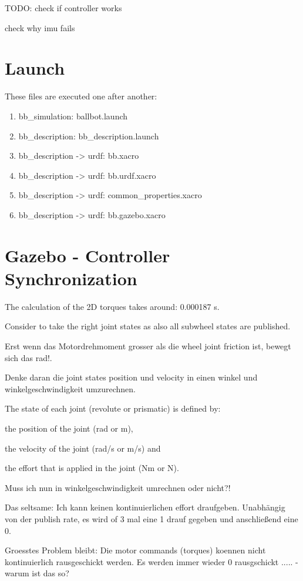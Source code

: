 \documentclass[twoside,colorback,accentcolor=tud4c,11pt]{tudreport}
\begin{document}
TODO: 
check if controller works

check why imu fails

\section{Launch}
These files are executed one after another:
\begin{enumerate}
	\item bb\_simulation: ballbot.launch
	\item bb\_description: bb\_description.launch
	\item bb\_description -> urdf: bb.xacro
	\item bb\_description -> urdf: bb.urdf.xacro
	\item bb\_description -> urdf: common\_properties.xacro
	\item bb\_description -> urdf: bb.gazebo.xacro
\end{enumerate}

\section{Gazebo - Controller Synchronization }
The calculation of the 2D torques takes around: 0.000187 s. 

Consider to take the right joint states as also all subwheel states are published.

Erst wenn das Motordrehmoment grosser als die wheel joint friction ist, bewegt sich das rad!.

Denke daran die joint states position und velocity in einen winkel und winkelgeschwindigkeit umzurechnen.

 The state of each joint (revolute or prismatic) is defined by:

 the position of the joint (rad or m),
 
 the velocity of the joint (rad/s or m/s) and 
 
 the effort that is applied in the joint (Nm or N).
 
 
 Muss ich nun in winkelgeschwindigkeit umrechnen oder nicht?!
 
 Das seltsame: Ich kann keinen kontinuierlichen effort draufgeben. Unabhängig von der publish rate, es wird of 3 mal eine 1 drauf gegeben und anschließend eine 0.
 
 Groesstes Problem bleibt: Die motor commands (torques) koennen nicht kontinuierlich rausgeschickt werden. Es werden immer wieder 0 rausgschickt ..... - warum ist das so?
\end{document}
